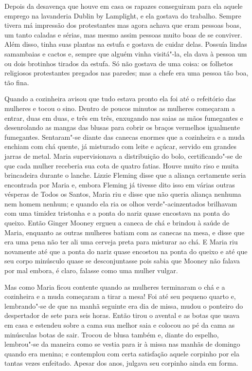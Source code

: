 Depois da desavença que houve em casa os rapazes conseguiram para ela aquele
emprego na lavanderia Dublin by Lamplight, e ela gostava do trabalho.  Sempre
tivera má impressão dos protestantes mas agora achava que eram pessoas boas, um
tanto caladas e sérias, mas mesmo assim pessoas muito boas de se conviver.
Além disso, tinha suas plantas na estufa e gostava de cuidar delas.  Possuía
lindas samambaias e cactos e, sempre que alguém vinha visitá"-la, ela dava à
pessoa um ou dois brotinhos tirados da estufa.  Só não gostava de uma coisa: os
folhetos religiosos protestantes pregados nas paredes; mas a chefe era uma
pessoa tão boa, tão fina.

Quando a cozinheira avisou que tudo estava pronto ela foi até o refeitório das
mulheres e tocou o sino.  Dentro de poucos minutos as mulheres começaram a
entrar, duas em duas, e três em três, enxugando nas saias as mãos fumegantes e
desenrolando as mangas das blusas para cobrir os braços vermelhos igualmente
fumegantes.  Sentaram"-se diante das canecas enormes que a cozinheira e a muda
enchiam com chá quente, já misturado com leite e açúcar, servido em grandes
jarras de metal.  Maria supervisionava a distribuição do bolo, certificando"-se
de que cada mulher receberia sua cota de quatro fatias.  Houve muito riso e
muita brincadeira durante o lanche.  Lizzie Fleming disse que a aliança
certamente seria encontrada por Maria e, embora Fleming já tivesse dito isso em
várias outras vésperas de Todos os Santos, Maria riu e disse que não queria
aliança nenhuma nem homem nenhum; e quando ela ria os olhos verde"-acinzentados
brilhavam com uma timidez tristonha e a ponta do nariz quase encostava na ponta
do queixo.  Então Ginger Mooney ergueu a caneca de chá e brindou à saúde de
Maria, enquanto as outras mulheres batiam com as canecas na mesa, e disse que
era uma pena não ter ali uma cerveja preta para misturar ao chá.  E Maria riu
novamente até que a ponta do nariz quase encostou na ponta do queixo e até que
seu corpo minúsculo quase se desconjuntasse pois sabia que Mooney não falava
por mal embora, é claro, falasse como uma mulher vulgar.

Mas como Maria ficou contente quando as mulheres terminaram o chá e a
cozinheira e a muda começaram a tirar a mesa!  Foi até seu pequeno quarto e,
lembrando"-se de que na manhã seguinte era dia de missa, mudou o ponteiro do
despertador de sete para seis horas.  Então tirou o avental e as botas que
usava em casa e estendeu sobre a cama sua melhor saia e colocou ao pé da cama
as minúsculas botas de sair.  Trocou de blusa também e, diante do espelho,
lembrou"-se da maneira como se vestia para ir à missa nas manhãs de domingo
quando era menina; e contemplou com certa satisfação aquele corpinho por ela
tantas vezes enfeitado.  Apesar dos anos, julgava seu corpinho ainda em forma.

